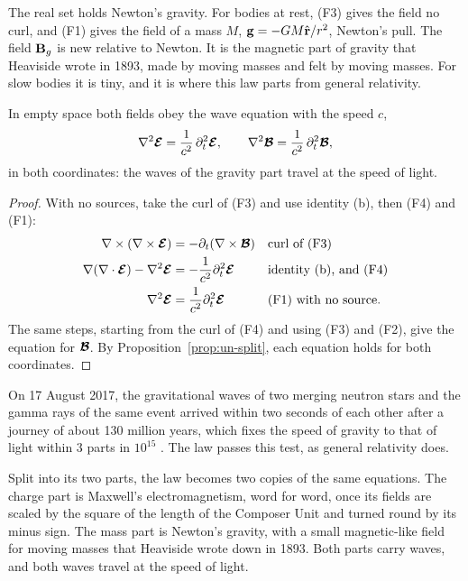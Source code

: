 The real set holds Newton's gravity. For bodies at rest, (F3) gives the field no curl, and (F1) gives the field of a mass $M$, $\mathbf{g} = -GM\hat{\mathbf{r}}/r^2$, Newton's pull. The field $\mathbf{B}_g$ is new relative to Newton. It is the magnetic part of gravity that Heaviside wrote in 1893, made by moving masses and felt by moving masses. For slow bodies it is tiny, and it is where this law parts from general relativity.

\begin{theorem}\label{thm:un-waves}
In empty space both fields obey the wave equation with the speed $c$,
\[
\nabla^2\boldsymbol{\mathcal{E}} = \frac{1}{c^2}\,\partial_t^2\boldsymbol{\mathcal{E}} , \qquad \nabla^2\boldsymbol{\mathcal{B}} = \frac{1}{c^2}\,\partial_t^2\boldsymbol{\mathcal{B}} ,
\]
in both coordinates: the waves of the gravity part travel at the speed of light.
\end{theorem}

\begin{proof}
With no sources, take the curl of (F3) and use identity (b), then (F4) and (F1):
\begin{align*}
\nabla\times(\nabla\times\boldsymbol{\mathcal{E}}) &= -\partial_t(\nabla\times\boldsymbol{\mathcal{B}}) && \text{curl of (F3)}\\
\nabla(\nabla\cdot\boldsymbol{\mathcal{E}}) - \nabla^2\boldsymbol{\mathcal{E}} &= -\frac{1}{c^2}\partial_t^2\boldsymbol{\mathcal{E}} && \text{identity (b), and (F4)}\\
\nabla^2\boldsymbol{\mathcal{E}} &= \frac{1}{c^2}\partial_t^2\boldsymbol{\mathcal{E}} && \text{(F1) with no source.}
\end{align*}
The same steps, starting from the curl of (F4) and using (F3) and (F2), give the equation for $\boldsymbol{\mathcal{B}}$. By Proposition~\ref{prop:un-split}, each equation holds for both coordinates.
\end{proof}

On 17 August 2017, the gravitational waves of two merging neutron stars and the gamma rays of the same event arrived within two seconds of each other after a journey of about 130 million years, which fixes the speed of gravity to that of light within $3$ parts in $10^{15}$ \citep{Abbott2017GRB}. The law passes this test, as general relativity does.

\begin{plainwords}
Split into its two parts, the law becomes two copies of the same equations. The charge part is Maxwell's electromagnetism, word for word, once its fields are scaled by the square of the length of the Composer Unit and turned round by its minus sign. The mass part is Newton's gravity, with a small magnetic-like field for moving masses that Heaviside wrote down in 1893. Both parts carry waves, and both waves travel at the speed of light.
\end{plainwords}

